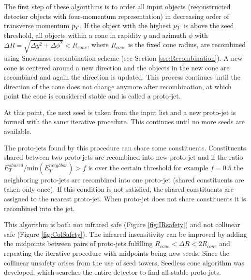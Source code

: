 The first step of these algorithms is to order all input objects (reconstructed
detector objects with four-momentum representation) in decreasing order of
transverse momentum $p_{T}$. If the object with the highest $p_{T}$ is above the
seed threshold, all objects within a cone in rapidity $y$ and azimuth
$\phi$ with $\Delta R = \sqrt{\Delta y^2 + \Delta \phi^2} < R_{cone}$, where
$R_{cone}$ is the fixed cone radius, are recombined using Snowmass recombination
scheme (see Section \ref{sse:Recombination}).  A new cone is centered around a
new direction and the objects in the new cone are recombined and again the
direction is updated. This process continues until the direction of the cone
does not change anymore after recombination, at which point the cone is
considered stable and is called a proto-jet. 

At this point, the next seed is taken from the input list and a new proto-jet is
formed with the same iterative procedure. This continues until no more seeds are
available. 

The proto-jets found by this procedure can share some constituents. Constituents
shared between two proto-jets are recombined into new proto-jet and if the ratio
$E_T^{shared} / \text{min} ( E_T^{neighbor} ) > f$ is over the certain threshold
for example 
$f = 0.5$ the neighboring proto-jets are recombined into one proto-jet (shared
constituents are taken only once). If this condition is not satisfied, the
shared constituents are assigned to the nearest proto-jet. When proto-jet does
not share constituents it is recombined into the jet.

This algorithm is both not infrared safe (Figure \ref{fig:IRsafety}) and not
collinear safe (Figure \ref{fig:ColSafety}). The infrared insensitivity can be
improved by adding the midpoints between pairs of proto-jets fulfilling
$R_{cone} < \Delta R < 2 R_{cone}$ and repeating the iterative procedure with
midpoints being new seeds. Since the collinear unsafety arises from the use of
seed towers, Seedless cone algorithm was developed, which searches the entire
detector to find all stable proto-jets.

